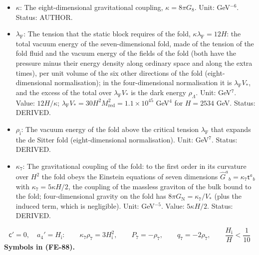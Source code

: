 \documentclass[
  10pt,
]{article}
\begin{document}
\begin{itemize}
\item
  \(\kappa\): The eight-dimensional gravitational coupling,
  \(\kappa = 8\pi G_8\). Unit: GeV\(^{-6}\). Status: AUTHOR.
\item
  \(\lambda_{\mathrm{F}}\): The tension that the static block requires
  of the fold, \(\kappa\lambda_{\mathrm{F}} = 12H\): the total vacuum
  energy of the seven-dimensional fold, made of the tension of the fold
  fluid and the vacuum energy of the fields of the fold (both have the
  pressure minus their energy density along ordinary space and along the
  extra times), per unit volume of the six other directions of the fold
  (eight-dimensional normalisation); in the four-dimensional
  normalisation it is \(\lambda_{\mathrm{F}}V_*\), and the excess of the
  total over \(\lambda_{\mathrm{F}}V_*\) is the dark energy
  \(\rho_\Lambda\). Unit: GeV\(^7\). Value: \(12H/\kappa\);
  \(\lambda_{\mathrm{F}}V_* = 30H^2M_{\mathrm{red}}^2 = 1.1\times10^{45}\)
  GeV\(^4\) for \(H = 2534\) GeV. Status: DERIVED.
\item
  \(\rho_{\mathrm{i}}\): The vacuum energy of the fold above the
  critical tension \(\lambda_{\mathrm{F}}\) that expands the de Sitter
  fold (eight-dimensional normalisation). Unit: GeV\(^7\). Status:
  DERIVED.
\item
  \(\kappa_7\): The gravitational coupling of the fold: to the first
  order in its curvature over \(H^2\) the fold obeys the Einstein
  equations of seven dimensions
  \(\hat G^a{}_b = \kappa_7\mathsf{t}^a{}_b\) with
  \(\kappa_7 = 5\kappa H/2\), the coupling of the massless graviton of
  the bulk bound to the fold; four-dimensional gravity on the fold has
  \(8\pi G_{\mathrm{N}} = \kappa_7/V_*\) (plus the induced term, which
  is negligible). Unit: GeV\(^{-5}\). Value: \(5\kappa H/2\). Status:
  DERIVED.
\end{itemize}

\[
\mathsf{c}' = 0,\quad a_4' = H_{\mathrm{i}}:\qquad \kappa_7\rho_7 = 3H_{\mathrm{i}}^2,\qquad P_7 = -\rho_7,\qquad q_7 = -2\rho_7,\qquad
\frac{H_{\mathrm{i}}}{H} < \frac{1}{10} \tag{FE-88}
\] \textbf{Symbols in (FE-88).}
\end{document}
